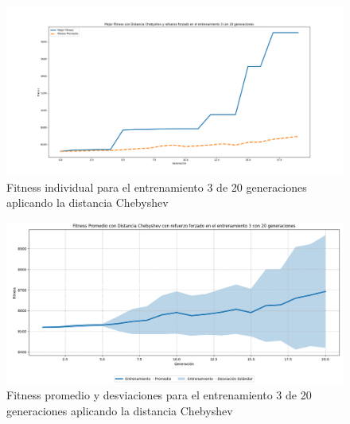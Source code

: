 \documentclass[conference]{IEEEtran}
\begin{document}
\begin{figure}[H]
    \centering
    \includegraphics[width=0.9 \linewidth]{Chebyshev/Fitness_individual_20Gen/Fitness_3_Cheby_20Gen.png}
    \caption{Fitness individual para el entrenamiento 3 de 20 generaciones aplicando la distancia Chebyshev}
    \label{fig:cheb_3_20}
\end{figure}
\begin{figure}[H]
    \centering
    \includegraphics[width=0.9 \linewidth]{Chebyshev/Fitness_individual_20Gen/Fitness_3_Cheby_20Gen_Sombra.png}
    \caption{Fitness promedio y desviaciones para el entrenamiento 3 de 20 generaciones aplicando la distancia Chebyshev}
    \label{fig:cheb_3_20_sombra}
\end{figure}
\end{document}
